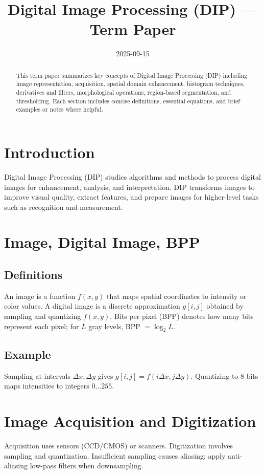 \documentclass[12pt,a4paper]{article}
\title{Digital Image Processing (DIP) --- Term Paper}
\author{}
\date{2025-09-15}
\begin{document}
\maketitle
\begin{abstract}
This term paper summarizes key concepts of Digital Image Processing (DIP) including image representation, acquisition, spatial domain enhancement, histogram techniques, derivatives and filters, morphological operations, region-based segmentation, and thresholding. Each section includes concise definitions, essential equations, and brief examples or notes where helpful.
\end{abstract}

\tableofcontents
\newpage

\section{Introduction}
Digital Image Processing (DIP) studies algorithms and methods to process digital images for enhancement, analysis, and interpretation. DIP transforms images to improve visual quality, extract features, and prepare images for higher-level tasks such as recognition and measurement.

\section{Image, Digital Image, BPP}
\subsection*{Definitions}
An image is a function $f(x,y)$ that maps spatial coordinates to intensity or color values. A digital image is a discrete approximation $g[i,j]$ obtained by sampling and quantizing $f(x,y)$. Bits per pixel (BPP) denotes how many bits represent each pixel; for $L$ gray levels, BPP $=\log_2 L$.

\subsection*{Example}
Sampling at intervals $\Delta x,\Delta y$ gives $g[i,j]=f(i\Delta x,j\Delta y)$. Quantizing to 8 bits maps intensities to integers $0\ldots255$.

\section{Image Acquisition and Digitization}
Acquisition uses sensors (CCD/CMOS) or scanners. Digitization involves sampling and quantization. Insufficient sampling causes aliasing; apply anti-aliasing low-pass filters when downsampling.
\end{document}
